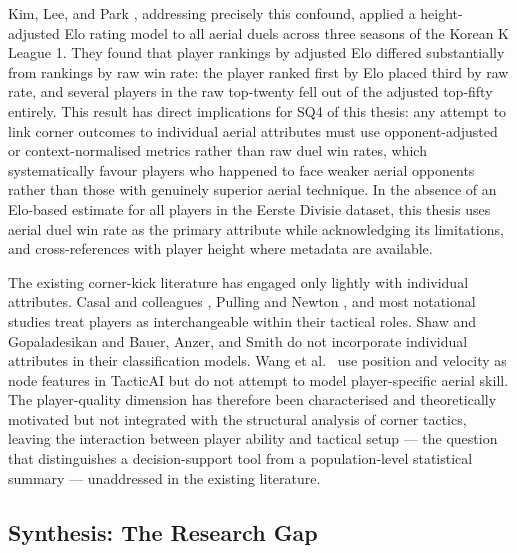 Kim, Lee, and Park \cite{Kim2024}, addressing precisely this confound,
applied a height-adjusted Elo rating model to all aerial duels across three
seasons of the Korean K League 1. They found that player rankings by adjusted
Elo differed substantially from rankings by raw win rate: the player ranked first
by Elo placed third by raw rate, and several players in the raw top-twenty fell
out of the adjusted top-fifty entirely. This result has direct implications for
SQ4 of this thesis: any attempt to link corner outcomes to individual aerial
attributes must use opponent-adjusted or context-normalised metrics rather than
raw duel win rates, which systematically favour players who happened to face
weaker aerial opponents rather than those with genuinely superior aerial
technique. In the absence of an Elo-based estimate for all players in the Eerste
Divisie dataset, this thesis uses aerial duel win rate as the primary attribute
while acknowledging its limitations, and cross-references with player height
where metadata are available.

The existing corner-kick literature has engaged only lightly with individual
attributes. Casal and colleagues \cite{Casal2015, Casal2017}, Pulling and
Newton \cite{PullingNewton2017}, and most notational studies treat players
as interchangeable within their tactical roles. Shaw and Gopaladesikan
\cite{ShawGopaladesikan2020} and Bauer, Anzer, and Smith
\cite{Bauer2022} do not incorporate individual attributes in their
classification models. Wang et al.\ \cite{Wang2024} use position and
velocity as node features in TacticAI but do not attempt to model player-specific
aerial skill. The player-quality dimension has therefore been characterised and
theoretically motivated but not integrated with the structural analysis of corner
tactics, leaving the interaction between player ability and tactical setup ---
the question that distinguishes a decision-support tool from a population-level
statistical summary --- unaddressed in the existing literature.

\subsection{Synthesis: The Research Gap}
\label{sec:lit_gap}


